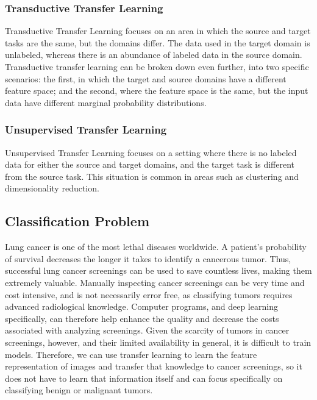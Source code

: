 \documentclass[10pt,twocolumn,letterpaper]{article}
\begin{document}
      \subsubsection{Transductive Transfer Learning} \label{sec:intro-types-transductive}
         Transductive Transfer Learning focuses on an area in which the source and target tasks are the same, but the domains
         differ. The data used in the target domain is unlabeled, whereas there is an abundance of labeled data in the source
         domain. Transductive transfer learning can be broken down even further, into two specific scenarios: the first, in
         which the target and source domains have a different feature space; and the second, where the feature space is the
         same, but the input data have different marginal probability distributions.

      \subsubsection{Unsupervised Transfer Learning} \label{sec:intro-types-unsupervised}
         Unsupervised Transfer Learning focuses on a setting where there is no labeled data for either the source and target
         domains, and the target task is different from the source task. This situation is common in areas such as clustering
         and dimensionality reduction.


\subsection{Classification Problem} \label{sec:intro-class}
	Lung cancer is one of the most lethal diseases worldwide. A patient’s probability of survival decreases the longer it takes to identify a cancerous tumor. Thus, successful lung cancer screenings can be used to save countless lives, making them extremely valuable. Manually inspecting cancer screenings can be very time and cost intensive, and is not necessarily error free, as classifying tumors requires advanced radiological knowledge. Computer programs, and deep learning specifically, can therefore help enhance the quality and decrease the costs associated with analyzing screenings. Given the scarcity of tumors in cancer screenings, however, and their limited availability in general, it is difficult to train models. Therefore, we can use transfer learning to learn the feature representation of images and transfer that knowledge to cancer screenings, so it does not have to learn that information itself and can focus specifically on classifying benign or malignant tumors.
\end{document}
